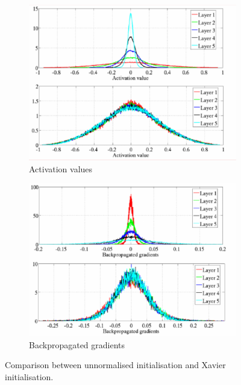 \begin{figure}[ht]
    \centering
    \begin{subfigure}[b]{0.5\textwidth}
        \includegraphics[width=\linewidth]{img/initcomparison1.png}
        \caption{Activation values}
        \label{fig:initcomp1}
    \end{subfigure}%
    \begin{subfigure}[b]{0.5\textwidth}
        \includegraphics[width=\linewidth]{img/initcomparison2.png}
        \caption{Backpropagated gradients}
        \label{fig:initcomp2}
    \end{subfigure}
    \caption{Comparison between unnormalised initialisation and Xavier initialisation.}
    \label{fig:initcomparisons}
\end{figure}




